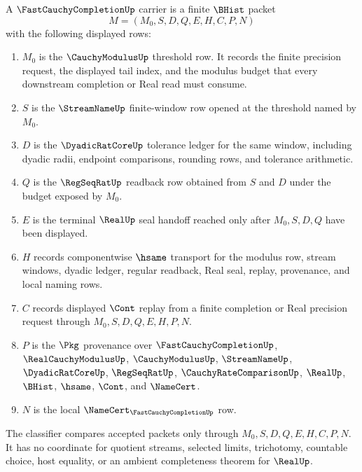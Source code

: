 \begin{definition}
\label{def:fast-cauchy-completion-carrier}
A $\FastCauchyCompletionUp$ carrier is a finite $\BHist$ packet
$$
M=(M_0,S,D,Q,E,H,C,P,N)
$$
with the following displayed rows:
\begin{enumerate}
\item $M_0$ is the $\CauchyModulusUp$ threshold row. It records the finite precision request, the displayed tail index, and the modulus budget that every downstream completion or Real read must consume.
\item $S$ is the $\StreamNameUp$ finite-window row opened at the threshold named by $M_0$.
\item $D$ is the $\DyadicRatCoreUp$ tolerance ledger for the same window, including dyadic radii, endpoint comparisons, rounding rows, and tolerance arithmetic.
\item $Q$ is the $\RegSeqRatUp$ readback row obtained from $S$ and $D$ under the budget exposed by $M_0$.
\item $E$ is the terminal $\RealUp$ seal handoff reached only after $M_0,S,D,Q$ have been displayed.
\item $H$ records componentwise $\hsame$ transport for the modulus row, stream windows, dyadic ledger, regular readback, Real seal, replay, provenance, and local naming rows.
\item $C$ records displayed $\Cont$ replay from a finite completion or Real precision request through $M_0,S,D,Q,E,H,P,N$.
\item $P$ is the $\Pkg$ provenance over $\FastCauchyCompletionUp$, $\RealCauchyModulusUp$, $\CauchyModulusUp$, $\StreamNameUp$, $\DyadicRatCoreUp$, $\RegSeqRatUp$, $\CauchyRateComparisonUp$, $\RealUp$, $\BHist$, $\hsame$, $\Cont$, and $\NameCert$.
\item $N$ is the local $\NameCert_{\FastCauchyCompletionUp}$ row.
\end{enumerate}
The classifier compares accepted packets only through $M_0,S,D,Q,E,H,C,P,N$. It has no coordinate for quotient streams, selected limits, trichotomy, countable choice, host equality, or an ambient completeness theorem for $\RealUp$.
\end{definition}

